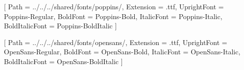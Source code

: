 
\usepackage{fontspec}

\setmainfont{Poppins}[
  Path = ../../../shared/fonts/poppins/,
  Extension = .ttf,
  UprightFont = Poppins-Regular,
  BoldFont = Poppins-Bold,
  ItalicFont = Poppins-Italic,
  BoldItalicFont = Poppins-BoldItalic
]

\newfontfamily{}[
  Path = ../../../shared/fonts/opensans/,
  Extension = .ttf,
  UprightFont = OpenSans-Regular,
  BoldFont = OpenSans-Bold,
  ItalicFont = OpenSans-Italic,
  BoldItalicFont = OpenSans-BoldItalic
]


\usepackage[brazilian]{babel}
\usepackage{microtype}


\usepackage{fancyhdr}
\usepackage{multicol}
\usepackage{parskip}
\usepackage[
a4paper,
top=2cm,
bottom=1.4cm,
left=1.1cm,
right=1.1cm
]{geometry}


\usepackage{tcolorbox}
\usepackage{tikz}


\usepackage{graphicx}
\usepackage[hidelinks]{hyperref}
\usepackage{refcount}
\usepackage{bookmark}
 
\usepackage{titlesec}
\usepackage{enumitem}


\usepackage{amsmath}
\usepackage{amssymb}


\usepackage{booktabs}